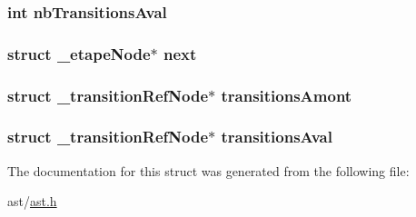 \subsubsection[{\texorpdfstring{nb\+Transitions\+Aval}{nbTransitionsAval}}]{\setlength{\rightskip}{0pt plus 5cm}int nb\+Transitions\+Aval}\hypertarget{struct__etape_node_af3650cfdb0e70be600cdce601acc6146}{}\label{struct__etape_node_af3650cfdb0e70be600cdce601acc6146}
\subsubsection[{\texorpdfstring{next}{next}}]{\setlength{\rightskip}{0pt plus 5cm}struct {\bf \+\_\+etape\+Node}$\ast$ next}\hypertarget{struct__etape_node_a7612e1c7a3508d0016f935522a22bea3}{}\label{struct__etape_node_a7612e1c7a3508d0016f935522a22bea3}
\subsubsection[{\texorpdfstring{transitions\+Amont}{transitionsAmont}}]{\setlength{\rightskip}{0pt plus 5cm}struct {\bf \+\_\+transition\+Ref\+Node}$\ast$ transitions\+Amont}\hypertarget{struct__etape_node_ab019a62049ce1847642f4e3953d88cba}{}\label{struct__etape_node_ab019a62049ce1847642f4e3953d88cba}
\subsubsection[{\texorpdfstring{transitions\+Aval}{transitionsAval}}]{\setlength{\rightskip}{0pt plus 5cm}struct {\bf \+\_\+transition\+Ref\+Node}$\ast$ transitions\+Aval}\hypertarget{struct__etape_node_a0e3579f485181a5dcbcca301d24a2b74}{}\label{struct__etape_node_a0e3579f485181a5dcbcca301d24a2b74}


The documentation for this struct was generated from the following file\+:\begin{DoxyCompactItemize}
\item 
ast/\hyperlink{ast_8h}{ast.\+h}\end{DoxyCompactItemize}
